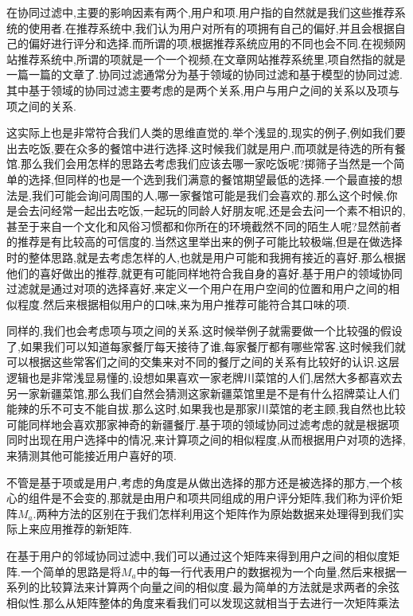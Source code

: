 在协同过滤中,主要的影响因素有两个,用户和项.用户指的自然就是我们这些推荐系统的使用者.在推荐系统中,我们认为用户对所有的项拥有自己的偏好,并且会根据自己的偏好进行评分和选择.而所谓的项,根据推荐系统应用的不同也会不同.在视频网站推荐系统中,所谓的项就是一个一个视频,在文章网站推荐系统里,项自然指的就是一篇一篇的文章了.协同过滤通常分为基于领域的协同过滤和基于模型的协同过滤.其中基于领域的协同过滤主要考虑的是两个关系,用户与用户之间的关系以及项与项之间的关系.

这实际上也是非常符合我们人类的思维直觉的.举个浅显的,现实的例子,例如我们要出去吃饭,要在众多的餐馆中进行选择.这时候我们就是用户,而项就是待选的所有餐馆.那么我们会用怎样的思路去考虑我们应该去哪一家吃饭呢?掷筛子当然是一个简单的选择,但同样的也是一个选到我们满意的餐馆期望最低的选择.一个最直接的想法是,我们可能会询问周围的人,哪一家餐馆可能是我们会喜欢的.那么这个时候,你是会去问经常一起出去吃饭,一起玩的同龄人好朋友呢,还是会去问一个素不相识的,甚至于来自一个文化和风俗习惯都和你所在的环境截然不同的陌生人呢?显然前者的推荐是有比较高的可信度的.当然这里举出来的例子可能比较极端,但是在做选择时的整体思路,就是去考虑怎样的人,也就是用户可能和我拥有接近的喜好.那么根据他们的喜好做出的推荐,就更有可能同样地符合我自身的喜好.基于用户的领域协同过滤就是通过对项的选择喜好,来定义一个用户在用户空间的位置和用户之间的相似程度.然后来根据相似用户的口味,来为用户推荐可能符合其口味的项.

同样的,我们也会考虑项与项之间的关系.这时候举例子就需要做一个比较强的假设了,如果我们可以知道每家餐厅每天接待了谁,每家餐厅都有哪些常客.这时候我们就可以根据这些常客们之间的交集来对不同的餐厅之间的关系有比较好的认识.这层逻辑也是非常浅显易懂的,设想如果喜欢一家老牌川菜馆的人们,居然大多都喜欢去另一家新疆菜馆,那么我们自然会猜测这家新疆菜馆里是不是有什么招牌菜让人们能辣的乐不可支不能自拔.那么这时,如果我也是那家川菜馆的老主顾,我自然也比较可能同样地会喜欢那家神奇的新疆餐厅.基于项的领域协同过滤考虑的就是根据项同时出现在用户选择中的情况,来计算项之间的相似程度,从而根据用户对项的选择,来猜测其他可能接近用户喜好的项.

不管是基于项或是用户,考虑的角度是从做出选择的那方还是被选择的那方,一个核心的组件是不会变的,那就是由用户和项共同组成的用户评分矩阵,我们称为评价矩阵$M_a$.两种方法的区别在于我们怎样利用这个矩阵作为原始数据来处理得到我们实际上来应用推荐的新矩阵.

在基于用户的邻域协同过滤中,我们可以通过这个矩阵来得到用户之间的相似度矩阵.一个简单的思路是将$M_a$中的每一行代表用户的数据视为一个向量,然后来根据一系列的比较算法来计算两个向量之间的相似度.最为简单的方法就是求两者的余弦相似性.那么从矩阵整体的角度来看我们可以发现这就相当于去进行一次矩阵乘法

